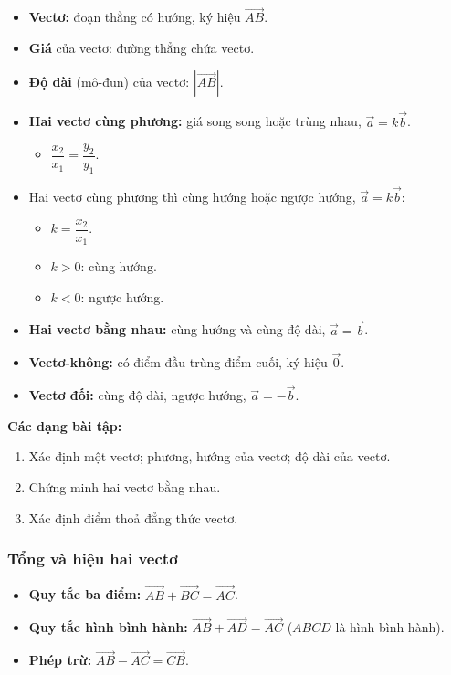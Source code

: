 \documentclass[12pt,a4paper]{article}
\begin{document}
\begin{dinhnghia}
  \begin{itemize}
    \item \textbf{Vectơ:} đoạn thẳng có hướng, ký hiệu $\overrightarrow{AB}$.
    \item \textbf{Giá} của vectơ: đường thẳng chứa vectơ.
    \item \textbf{Độ dài} (mô-đun) của vectơ: $|\overrightarrow{AB}|$.
    \item \textbf{Hai vectơ cùng phương:} giá song song hoặc trùng nhau, $\vec a = k\vec b$.
      \begin{itemize}
        \item $\dfrac{x_2}{x_1} = \dfrac{y_2}{y_1}$.
      \end{itemize}
    \item Hai vectơ cùng phương thì cùng hướng hoặc ngược hướng, $\vec a = k\vec b$:
      \begin{itemize}
        \item $k = \dfrac{x_2}{x_1}$.
        \item $k > 0$: cùng hướng.
        \item $k < 0$: ngược hướng.
      \end{itemize}
    \item \textbf{Hai vectơ bằng nhau:} cùng hướng và cùng độ dài, $\vec a = \vec b$.
    \item \textbf{Vectơ-không:} có điểm đầu trùng điểm cuối, ký hiệu $\vec{0}$.
    \item \textbf{Vectơ đối:} cùng độ dài, ngược hướng, $\vec a = -\vec b$.
  \end{itemize}
\end{dinhnghia}

\medskip\noindent\textbf{Các dạng bài tập:}
\begin{enumerate}[label=\textbf{Dạng \arabic*:}, leftmargin=*, align=left]
  \item Xác định một vectơ; phương, hướng của vectơ; độ dài của vectơ.
  \item Chứng minh hai vectơ bằng nhau.
  \item Xác định điểm thoả đẳng thức vectơ.
\end{enumerate}

\subsubsection{Tổng và hiệu hai vectơ}

\begin{congthuc}[title={Các quy tắc cộng, trừ vectơ}]
  \begin{itemize}
    \item \textbf{Quy tắc ba điểm:} $\overrightarrow{AB} + \overrightarrow{BC} = \overrightarrow{AC}$.
    \item \textbf{Quy tắc hình bình hành:} $\overrightarrow{AB} + \overrightarrow{AD} = \overrightarrow{AC}$ ($ABCD$ là hình bình hành).
    \item \textbf{Phép trừ:} $\overrightarrow{AB} - \overrightarrow{AC} = \overrightarrow{CB}$.
  \end{itemize}
\end{congthuc}
\end{document}
